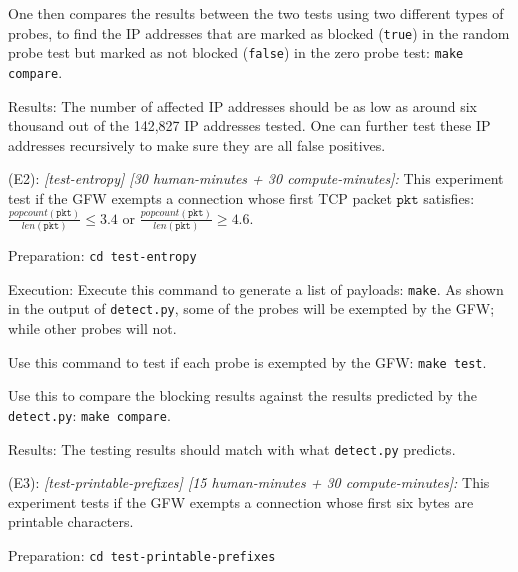\begin{compactdesc}
\begin{asparadesc}
        One then compares the results between the two tests using two different types of probes,
        to find the IP addresses that are marked as blocked (\texttt{true}) in the random probe test 
        but marked as not blocked (\texttt{false}) in the zero probe test:
        \texttt{make compare}.
        
        \item[Results:] 
        The number of affected IP addresses should be as low as around six thousand out of the 142,827 IP addresses tested.
        One can further test these IP addresses recursively to make sure they are all false positives.
    \end{asparadesc}

    \item[(E2):] \textit{[test-entropy] [30 human-minutes + 30 compute-minutes]:}
    This experiment test if the GFW exempts a connection whose
    first TCP packet $\mathtt{pkt}$ satisfies:
    $\frac{\mathit{popcount}(\mathtt{pkt})}{\mathit{len}(\mathtt{pkt})} \le 3.4$ or 
    $\frac{\mathit{popcount}(\mathtt{pkt})}{\mathit{len}(\mathtt{pkt})} \ge 4.6$. 

    \begin{asparadesc}
        \item[Preparation:] \texttt{cd test-entropy}

        \item[Execution:]
        Execute this command to generate a list of payloads: \texttt{make}. 
        As shown in the output of \texttt{detect.py},
        some of the probes will be exempted by the GFW; 
        while other probes will not.

        Use this command to test if each probe is exempted by the GFW:
        \texttt{make test}.

        Use this to compare the blocking results against the results predicted by the \texttt{detect.py}:
        \texttt{make compare}.

        \item[Results:] The testing results should match with what \texttt{detect.py} predicts.
    \end{asparadesc}


    \item[(E3):] \textit{[test-printable-prefixes] [15 human-minutes + 30 compute-minutes]:}
    This experiment tests if the GFW exempts a connection whose
    first six bytes are printable characters.
    \begin{asparadesc}
        \item[Preparation:] \texttt{cd test-printable-prefixes}


\end{asparadesc}
\end{compactdesc}
